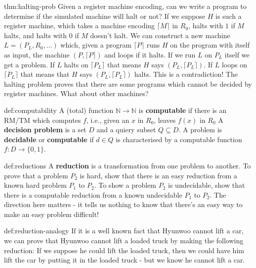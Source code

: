 \documentclass[landscape, 8pt]{extarticle}
\begin{document}
\begin{multicols}{3}
\begin{thm}{thm:halting-prob}{}
Given a register machine encoding, can we write a program to determine if the simulated machine will halt or not? \newline
If we suppose $H$ is such a register machine, which takes a machine encoding $\lceil M \rceil$ in $R_{0}$, halts with $1$ if $M$ halts, and halts with $0$ if $M$ doesn't halt. \newline
We can construct a new machine $L = (P_{L}, R_{0},\dots)$ which, given a program $\lceil P \rceil $ runs $H$ on the program with itself as input, the machine $(P, \lceil P \rceil )$ and loops if it halts. \newline
If we run $L$ on $P_{L}$ itself we get a problem. If $L$ halts on $\lceil P_{L} \rceil $ that means $H$ says $(P_{L}, \lceil P_{L} \rceil )$. If $L$ loops on $\lceil P_{L} \rceil $ that means that $H$ says $(P_{L}, \lceil P_{L} \rceil )$ halts.\newline
This is a contradiction! \newline
The halting problem proves that there are some programs which cannot be decided by register machines. What about other machines?
\end{thm}

\begin{dfn}[Computability]{def:computability}{}
A (total) function $\mathbb{N}\to\mathbb{N}$ is \textbf{computable} if there is an RM/TM which computes $f$, i.e., given an $x$ in $R_{0}$, leaves $f(x)$ in $R_{0}$\newline
A \textbf{decision problem} is a set $D$ and a quiery subset $Q\subseteq D$. A problem is \textbf{decidable} or \textbf{computable} if $d\in Q$ is characterised by a computable function $f : D\to \{0, 1\}$.
\end{dfn}


\begin{dfn}[Reductions]{def:reductions}{}
A \textbf{reduction} is a transformation from one problem to another. To prove that a problem $P_{2}$ is hard, show that there is an easy reduction from a known hard problem $P_{1}$ to $P_{2}$.\newline
To show a problem $P_{2}$ is undecidable, show that there is a computable reduction from a known undecidable $P_{1}$ to $P_{2}$. The direction here matters - it tells us nothing to know that there's an easy way to make an easy problem difficult!
\end{dfn}

\begin{xmp}{def:reduction-analogy}{}
If it is a well known fact that Hyunwoo cannot lift a car, we can prove that
Hyunwoo cannot lift a loaded truck by making the following reduction: If we
suppose he could lift the loaded truck, then we could have him lift the car by
putting it in the loaded truck - but we know he cannot lift a car.
\end{xmp}


\end{multicols}
\end{document}
